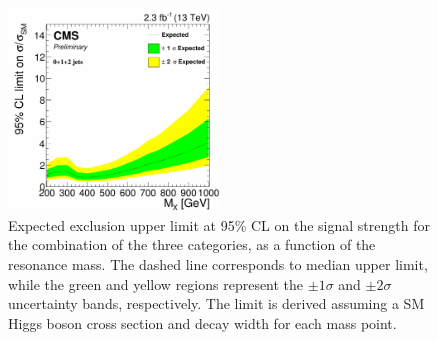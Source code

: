 \begin{figure}[htb]
\centering
\includegraphics[width=0.5\textwidth]{images/13TeV/HighMass/exp_limit_012jet_mu.pdf}
\caption{Expected exclusion upper limit at 95\% CL on the signal strength for the combination of the three categories, as a function of the resonance mass. The dashed line corresponds to median upper limit, while the green and yellow regions represent the $\pm 1\sigma$ and $\pm 2 \sigma$ uncertainty bands, respectively. The limit is derived assuming a SM Higgs boson cross section and decay width for each mass point.}\label{fig:13TeVcombexplim}
\end{figure}



